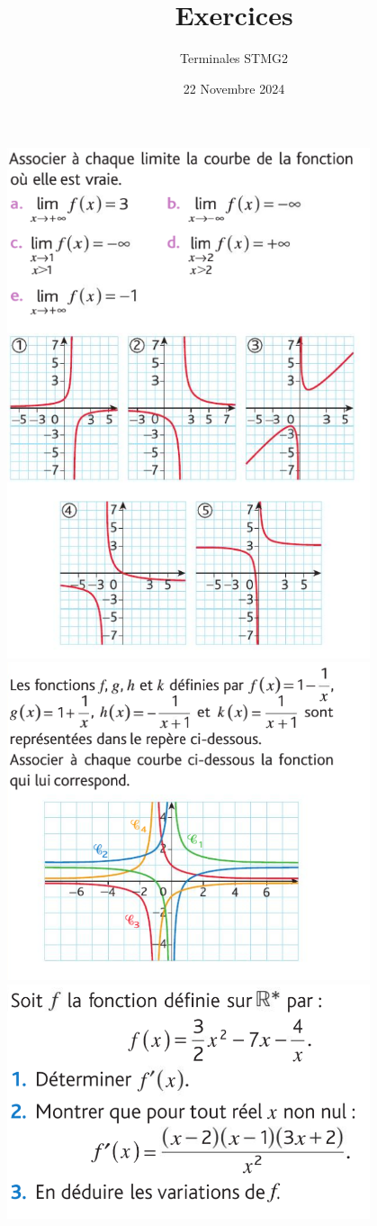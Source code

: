 \documentclass{article}
\title{Exercices}
\date{22 Novembre 2024}
\author{Terminales STMG2}
\begin{document}
\maketitle

\begin{center}
\includegraphics[width=0.8\textwidth]{Exercice_1.png}
\includegraphics[width=0.8\textwidth]{Exercice_2.png}
\includegraphics[width=0.8\textwidth]{Exercice_3.png}
\end{center}
\end{document}
